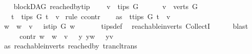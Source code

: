 \begin{isabellebody}
\endisatagproof
{\isafoldproof}%
%
\isadelimproof
\ \isanewline
%
\endisadelimproof
\isanewline
{}\isamarkupfalse%
\ {\isacharparenleft}{\kern0pt}\ blockDAG{\isacharparenright}{\kern0pt}\ reached{\isacharunderscore}{\kern0pt}by{\isacharunderscore}{\kern0pt}tip{\isacharcolon}{\kern0pt}\ \isanewline
\ \ \ {\isachardoublequoteopen}v\ {\isasymnotin}\ tips\ G{\isachardoublequoteclose}\isanewline
\ \ \ \ \ \ {\isachardoublequoteopen}v\ {\isasymin}\ verts\ G{\isachardoublequoteclose}\isanewline
\ \ \ {\isachardoublequoteopen}{\isasymexists}t\ {\isasymin}\ tips\ G{\isachardot}{\kern0pt}\ t\ {\isasymrightarrow}\isactrlsup {\isacharplus}{\kern0pt}\ v{\isachardoublequoteclose}\ \isanewline
%
\isadelimproof
%
\endisadelimproof
%
\isatagproof
{}\isamarkupfalse%
{\isacharparenleft}{\kern0pt}rule\ ccontr{\isacharparenright}{\kern0pt}\isanewline
\ \ \isamarkupfalse%
\ as{}{\isacharcolon}{\kern0pt}\ {\isachardoublequoteopen}{\isasymnot}\ {\isacharparenleft}{\kern0pt}{\isasymexists}t{\isasymin}tips\ G{\isachardot}{\kern0pt}\ t\ {\isasymrightarrow}\isactrlsup {\isacharplus}{\kern0pt}\ v{\isacharparenright}{\kern0pt}{\isachardoublequoteclose}\isanewline
\ \ \isamarkupfalse%
\ \isamarkupfalse%
\ {\isachardoublequoteopen}{\isasymforall}w{\isachardot}{\kern0pt}\ \ w\ {\isasymrightarrow}\isactrlsup {\isacharplus}{\kern0pt}\ v\ {\isasymlongrightarrow}\ {\isasymnot}\ is{\isacharunderscore}{\kern0pt}tip\ G\ w{\isachardoublequoteclose}\ \isanewline
\ \ \ \ \isamarkupfalse%
\ tips{\isacharunderscore}{\kern0pt}def\ \isamarkupfalse%
\ reachable{}{\isacharunderscore}{\kern0pt}in{\isacharunderscore}{\kern0pt}verts{\isacharparenleft}{\kern0pt}{}{\isacharparenright}{\kern0pt}\ CollectI\isanewline
\ \ \ \ \isamarkupfalse%
\ blast\ \isanewline
\ \ \isamarkupfalse%
\ \isamarkupfalse%
\ contr{\isacharcolon}{\kern0pt}\ {\isachardoublequoteopen}{\isasymforall}w{\isachardot}{\kern0pt}\ \ w\ {\isasymrightarrow}\isactrlsup {\isacharplus}{\kern0pt}\ v\ {\isasymlongrightarrow}\ \ {\isacharparenleft}{\kern0pt}{\isasymexists}y{\isachardot}{\kern0pt}\ y{\isasymrightarrow}\isactrlsup {\isacharplus}{\kern0pt}w\ {\isasymand}\ \ y{\isasymrightarrow}\isactrlsup {\isacharplus}{\kern0pt}v{\isacharparenright}{\kern0pt}{\isachardoublequoteclose}\isanewline
\ \ \ \ \isamarkupfalse%
\ as{}\ reachable{}{\isacharunderscore}{\kern0pt}in{\isacharunderscore}{\kern0pt}verts{\isacharparenleft}{\kern0pt}{}{\isacharparenright}{\kern0pt}\ reached{\isacharunderscore}{\kern0pt}by\ trancl{\isacharunderscore}{\kern0pt}trans\ \isanewline

\end{isabellebody}
